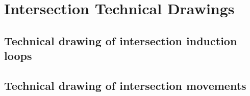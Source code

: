 \section{Intersection Technical Drawings}
\subsection{Technical drawing of intersection induction loops}
\label{appendix:techdrawloop}

\subsection{Technical drawing of intersection movements}
\label{appendix:techdrawmovement}
